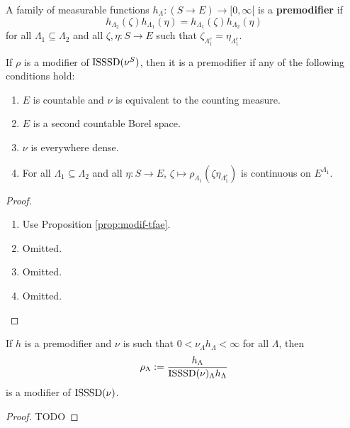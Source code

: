 \begin{definition}
    \label{def:premodif}
    \uses{}
    \leanok

    A family of measurable functions $h_\Lambda : (S \to E) \to [0, \infty[$ is a {\bf premodifier} if
    $$h_{\Lambda_2}(\zeta)h_{\Lambda_1}(\eta) = h_{\Lambda_1}(\zeta)h_{\Lambda_2}(\eta)$$
    for all $\Lambda_1 \subseteq \Lambda_2$ and all $\zeta, \eta : S \to E$ such that $\zeta_{\Lambda_1^c} = \eta_{\Lambda_1^c}$.
\end{definition}

\begin{lemma}
    \label{lem:modif-premodif}
    If $\rho$ is a modifier of $\operatorname{ISSSD}(\nu^S)$, then it is a premodifier if any of the following conditions hold:
    \begin{enumerate}
        \item $E$ is countable and $\nu$ is equivalent to the counting measure.
        \item $E$ is a second countable Borel space.
        \item $\nu$ is everywhere dense.
        \item For all $\Lambda_1 \subseteq \Lambda_2$ and all $\eta : S \to E$, $\zeta \mapsto \rho_{\Lambda_1}(\zeta \eta_{\Lambda_1^c})$ is continuous on $E^{\Lambda_1}$.
    \end{enumerate}
\end{lemma}
\begin{proof}

    \begin{enumerate}
        \item Use Proposition \ref{prop:modif-tfae}.
        \item Omitted.
        \item Omitted.
        \item Omitted.
    \end{enumerate}
\end{proof}

\begin{lemma}
    \label{lem:premodif-modif}
    \leanok
    If $h$ is a premodifier and $\nu$ is such that $0 < \nu_\Lambda h_\Lambda < \infty$ for all $\Lambda$, then
    $$\rho_\Lambda := \frac{h_\Lambda}{\operatorname{ISSSD}(\nu)_\Lambda h_\Lambda}$$
    is a modifier of $\operatorname{ISSSD}(\nu)$.
\end{lemma}
\begin{proof}

    TODO
\end{proof}

